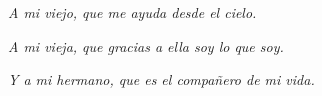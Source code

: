 \hfill \textit{A mi viejo, que me ayuda desde el cielo.}

\hfill \textit{A mi vieja, que gracias a ella soy lo que soy.} 

\hfill \textit{Y a mi hermano, que es el compañero de mi vida.}